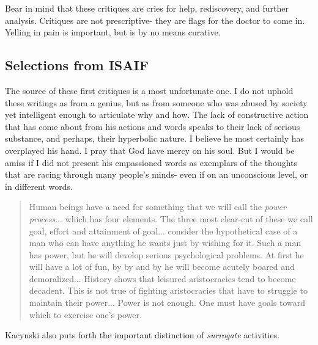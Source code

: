\documentclass[10pt,letterpaper,openany]{book}
\begin{document}
Bear in mind that these critiques are cries for help, rediscovery, and further analysis. Critiques are not prescriptive- they are flags for the doctor to come in. Yelling in pain is important, but is by no means curative.



\subsection{Selections from ISAIF}

The source of these first critiques is a most unfortunate one. I do not uphold these writings as from a genius, but as from someone who was abused by society yet intelligent enough to articulate why and how. The lack of constructive action that has come about from his actions and words speaks to their lack of serious substance, and perhaps, their hyperbolic nature. I believe he most certainly has overplayed his hand. I pray that God have mercy on his soul. But I would be amiss if I did not present his empassioned words as exemplars of the thoughts that are racing through many people's minds- even if on an unconscious level, or in different words.

\begin{quote}
Human beings have a need for something that we will call the \textit{power process}... which has four elements. The three most clear-cut of these we call goal, effort and attainment of goal... consider the hypothetical case of a man who can have anything he wants just by wishing for it. Such a man has power, but he will develop serious psychological problems. At first he will have a lot of fun, by by and by he will become acutely boared and demoralized... History shows that leisured aristocracies tend to become decadent. This is not true of fighting aristocracies that have to struggle to maintain their power... Power is not enough. One must have goals toward which to exercise one's power.
\end{quote}

Kacynski also puts forth the important distinction of \textit{surrogate} activities.
\end{document}
